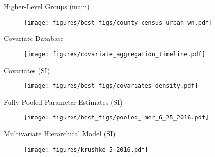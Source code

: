 \documentclass[pdf]{beamer}
\begin{document}

\begin{frame}{Higher-Level Groups (main)}
\begin{figure}[ht]
\begin{center}
\texttt{[image: figures/best\_figs/county\_census\_urban\_wn.pdf]}
\end{center}
\end{figure}
\end{frame}


\begin{frame}{Covariate Database}
\begin{figure}[ht]
\begin{center}
\texttt{[image: figures/covariate\_aggregation\_timeline.pdf]}
\end{center}
\end{figure}
\end{frame}


\begin{frame}{Covariates (SI)}
\begin{figure}[ht]
\begin{center}
\texttt{[image: figures/best\_figs/covariates\_density.pdf]}
\end{center}
\end{figure}
\end{frame}


\begin{frame}{Fully Pooled Parameter Estimates (SI)}
\begin{figure}[ht]
\begin{center}
\texttt{[image: figures/best\_figs/pooled\_lmer\_6\_25\_2016.pdf]}
\end{center}
\end{figure}
\end{frame}


\begin{frame}{Multivariate Hierarchical Model (SI)}
\begin{figure}[ht]
\begin{center}
\texttt{[image: figures/krushke\_5\_2016.pdf]}
\end{center}
\end{figure}
\end{frame}
\end{document}
